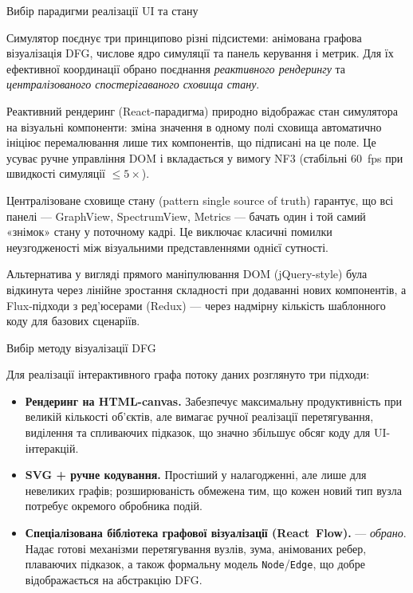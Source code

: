 \protect{}\label{_Toc228121446}{}Вибір парадигми реалізації
UI та стану

Симулятор поєднує три принципово різні підсистеми: анімована графова
візуалізація DFG, числове ядро симуляції та панель керування і метрик.
Для їх ефективної координації обрано поєднання \emph{реактивного
рендерингу} та \emph{централізованого спостерігаваного сховища стану}.

Реактивний рендеринг (React-парадигма) природно відображає стан
симулятора на візуальні компоненти: зміна значення в одному полі сховища
автоматично ініціює перемалювання лише тих компонентів, що підписані на
це поле. Це усуває ручне управління DOM і вкладається у вимогу NF3
(стабільні 60~fps при швидкості симуляції \(\leq 5 \times\)).

Централізоване сховище стану (pattern single source of truth) гарантує,
що всі панелі --- GraphView, SpectrumView, Metrics --- бачать один і той
самий «знімок» стану у поточному кадрі. Це виключає класичні помилки
неузгодженості між візуальними представленнями однієї сутності.

Альтернатива у вигляді прямого маніпулювання DOM (jQuery-style) була
відкинута через лінійне зростання складності при додаванні нових
компонентів, а Flux-підходи з ред'юсерами (Redux) --- через надмірну
кількість шаблонного коду для базових сценаріїв.

Вибір методу візуалізації DFG

Для реалізації інтерактивного графа потоку даних розглянуто три підходи:

\begin{itemize}
\item
  \textbf{Рендеринг на HTML-canvas.} Забезпечує максимальну
  продуктивність при великій кількості об'єктів, але вимагає ручної
  реалізації перетягування, виділення та спливаючих підказок, що значно
  збільшує обсяг коду для UI-інтеракцій.
\item
  \textbf{SVG + ручне кодування.} Простіший у налагодженні, але лише для
  невеликих графів; розширюваність обмежена тим, що кожен новий тип
  вузла потребує окремого обробника подій.
\item
  \textbf{Спеціалізована бібліотека графової візуалізації (React~Flow).}
  --- \emph{обрано}. Надає готові механізми перетягування вузлів, зума,
  анімованих ребер, плаваючих підказок, а також формальну модель
  \texttt{Node}/\texttt{Edge}, що добре відображається на абстракцію
  DFG.
\end{itemize}

